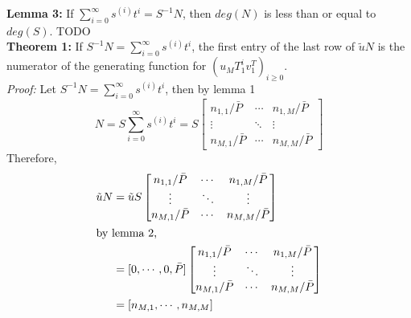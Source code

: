 \documentclass[12pt]{article}
\begin{document}
\noindent\textbf{Lemma 3:} If $\sum_{i = 0}^{\infty} s^{(i)} t^i = S^{-1}N$, then $deg(N)$ is
less than or equal to $deg(S)$. TODO\\

\noindent\textbf{Theorem 1:} If 
$S^{-1}N = \sum_{i=0}^{\infty} s^{(i)} t^i$, the first entry
of the last row of $\tilde{u} N$ is  the numerator of the generating function for 
$(u_{M} T_1^i v_{1}^T)_{i \ge 0}$.\\

\noindent\textit{Proof:} Let $S^{-1}N = \sum_{i=0}^{\infty} s^{(i)} t^i$, then by lemma 1
$$ N = S \sum_{i=0}^{\infty} s^{(i)} t^i = S 
\begin{bmatrix}
n_{1,1} / \bar{P} & \cdots & n_{1,M} / \bar{P} \\
\vdots            & \ddots & \vdots \\
n_{M,1} / \bar{P} & \cdots & n_{M,M} / \bar{P}
\end{bmatrix}
$$
Therefore,
\begin{align*}
\tilde{u} N &= \tilde{u} S
				\begin{bmatrix}
				n_{1,1} / \bar{P} & \cdots & n_{1,M} / \bar{P} \\
				\vdots            & \ddots & \vdots \\
				n_{M,1} / \bar{P} & \cdots & n_{M,M} / \bar{P}
				\end{bmatrix} \\
\intertext{by lemma 2,}
            &= [0,\cdots,0,\bar{P}]
               \begin{bmatrix}
               n_{1,1} / \bar{P} & \cdots & n_{1,M} / \bar{P} \\
               \vdots            & \ddots & \vdots \\
               n_{M,1} / \bar{P} & \cdots & n_{M,M} / \bar{P}
               \end{bmatrix}\\
            &= [n_{M,1} , \cdots , n_{M,M}]
\end{align*}
\end{document}
